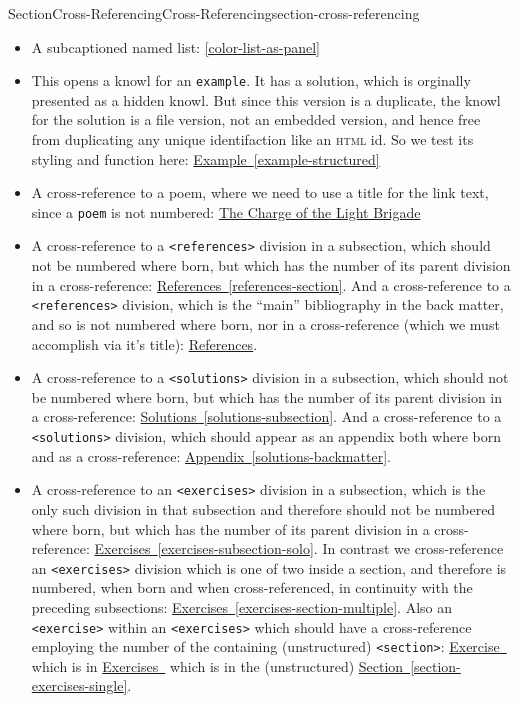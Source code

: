 \documentclass[twoside,10pt,]{article}
\newcommand{\xreffont}{\relax}
\newcommand{\mono}[1]{\texttt{#1}}
\newcommand{\initialism}[1]{\textsc{\MakeLowercase{#1}}}
\numberwithin{equation}{section}
\begin{document}
\begin{sectionptx}{Section}{Cross-Referencing}{}{Cross-Referencing}{}{}{section-cross-referencing}
\begin{itemize}[label=\textbullet]
\item{}A subcaptioned named list: \hyperref[color-list-as-panel]{{\xreffont\ref{color-list-as-panel}}}%
\item{}This opens a knowl for an \mono{example}.  It has a solution, which is orginally presented as a hidden knowl.  But since this version is a duplicate, the knowl for the solution is a file version, not an embedded version, and hence free from duplicating any unique identifaction like an \initialism{HTML} id.  So we test its styling and function here: \hyperref[example-structured]{Example~{\xreffont\ref{example-structured}}}%
\item{}A cross-reference to a poem, where we need to use a title for the link text, since a \mono{poem} is not numbered: \hyperref[poem-light-brigade]{The Charge of the Light Brigade}%
\item{}A cross-reference to a \mono{<references>} division in a subsection, which should not be numbered where born, but which has the number of its parent division in a cross-reference: \hyperref[references-section]{References~{\xreffont\ref{references-section}}}.  And a cross-reference to a \mono{<references>} division, which is the ``main'' bibliography in the back matter, and so is not numbered where born, nor in a cross-reference (which we must accomplish via it's title): \hyperlink{references-backmatter}{References}.%
\item{}A cross-reference to a \mono{<solutions>} division in a subsection, which should not be numbered where born, but which has the number of its parent division in a cross-reference: \hyperref[solutions-subsection]{Solutions~{\xreffont\ref{solutions-subsection}}}.  And a cross-reference to a \mono{<solutions>} division, which should appear as an appendix both where born and as a cross-reference: \hyperref[solutions-backmatter]{Appendix~{\xreffont\ref{solutions-backmatter}}}.%
\item{}A cross-reference to an \mono{<exercises>} division in a subsection, which is the only such division in that subsection and therefore should not be numbered where born, but which has the number of its parent division in a cross-reference: \hyperref[exercises-subsection-solo]{Exercises~{\xreffont\ref{exercises-subsection-solo}}}.  In contrast we cross-reference an \mono{<exercises>} division which is one of two inside a section, and therefore is numbered, when born and when cross-referenced, in continuity with the preceding subsections: \hyperref[exercises-section-multiple]{Exercises~{\xreffont\ref{exercises-section-multiple}}}.  Also an \mono{<exercise>} within an \mono{<exercises>} which should have a cross-reference employing the number of the containing (unstructured) \mono{<section>}: \hyperlink{duplicate-divisional}{Exercise~{\xreffont 36.2}} which is in \hyperlink{exercise-collection}{Exercises~{\xreffont 36}} which is in the (unstructured) \hyperref[section-exercises-single]{Section~{\xreffont\ref{section-exercises-single}}}.%

\end{itemize}
\end{sectionptx}
\end{document}
